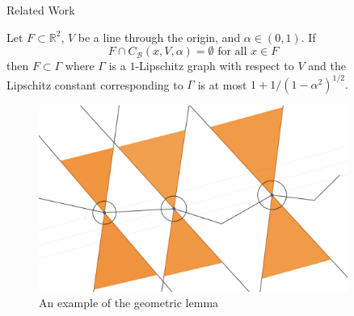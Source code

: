\documentclass[final]{beamer}
\newlength{\sepwidth}
\newlength{\colwidth}
\newcommand{\separatorcolumn}{\begin{column}{\sepwidth}\end{column}}
\newcommand{\rr}{\mathbb R}
\begin{document}
\begin{frame}[t]
\begin{columns}[t]
\begin{column}{\colwidth}
\end{column}

\separatorcolumn

\begin{column}{\colwidth}
\begin{block}{Related Work}

    Let $F \subset \rr^2$, $V$ be a line through the origin, and $\alpha \in(0,1)$. If
$$
F \cap C_{\mathcal{B}}(x, V, \alpha)=\emptyset \text { for all } x \in F
$$
then $F\subset \Gamma$ where $\Gamma$ is a $1$-Lipschitz graph with respect to $V$ and the Lipschitz constant corresponding to $\Gamma$ is at most $1+1 /\left(1-\alpha^{2}\right)^{1 / 2} .$

    \begin{figure}
      \centering
      \includegraphics[width = 6.5in]{images/old method.png}
      \caption{An example of the geometric lemma}
    \end{figure}

    
  \end{block}


\end{column}
\end{columns}
\end{frame}
\end{document}
